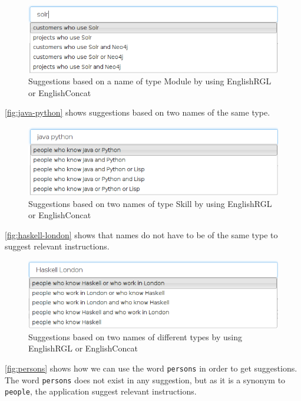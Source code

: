 \begin{figure}[H]
\includegraphics[scale=0.6,keepaspectratio,valign=t]{./gfx/solr.png}
\caption{Suggestions based on a name of type Module by using EnglishRGL or EnglishConcat\label{fig:name-module}}
\end{figure}

\autoref{fig:java-python} shows suggestions based on two names of the same type.

\begin{figure}[H]
\includegraphics[scale=0.6,keepaspectratio,valign=t]{./gfx/java_python.png}
\caption{Suggestions based on two names  of type Skill by using EnglishRGL or EnglishConcat\label{fig:java-python}}
\end{figure}

\autoref{fig:haskell-london} shows that names do not have to be of the same type to suggest relevant instructions.

\begin{figure}[H]
\includegraphics[scale=0.6,keepaspectratio,valign=t]{./gfx/haskell-london.png}
\caption{Suggestions based on two names of different types by using EnglishRGL or EnglishConcat\label{fig:haskell-london}}
\end{figure}

\autoref{fig:persons} shows how we can use the word \texttt{persons} in order to get suggestions. The word \texttt{persons} does not exist in any suggestion, but as it is a synonym to \texttt{people}, the application suggest relevant instructions.

